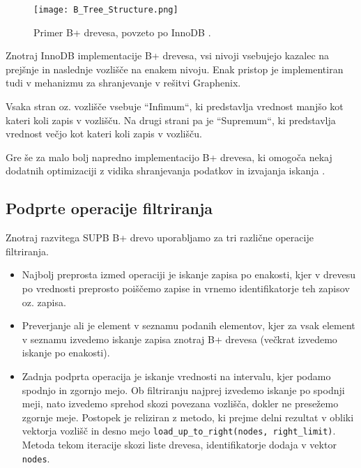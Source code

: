 \documentclass[a4paper,12pt,openright]{book}
\begin{document}
        \begin{figure}[H]
            \centerline{\texttt{[image: B\_Tree\_Structure.png]}}
            \caption{Primer B+ drevesa, povzeto po InnoDB \cite{BPTREE_INNODB}.}
            \label{btree_innodb}
        \end{figure}

        \noindent
        Znotraj InnoDB implementacije B+ drevesa, vsi nivoji vsebujejo kazalec na prejšnje in naslednje vozlišče na enakem nivoju. Enak pristop je implementiran tudi v mehanizmu za shranjevanje v rešitvi Graphenix. 
        
        Vsaka stran oz. vozlišče vsebuje ``Infimum``, ki predstavlja vrednost manjšo kot kateri koli zapis v vozlišču. Na drugi strani pa je ``Supremum``, ki predstavlja vrednost večjo kot kateri koli zapis v vozlišču.

        Gre še za malo bolj napredno implementacijo B+ drevesa, ki omogoča nekaj dodatnih optimizaciji z vidika shranjevanja podatkov in izvajanja iskanja \cite{BPTREE_INNODB}.
        
        \subsection{Podprte operacije filtriranja}
        
        Znotraj razvitega SUPB B+ drevo uporabljamo za tri različne operacije filtriranja.
        \begin{itemize}
            \item Najbolj preprosta izmed operaciji je iskanje zapisa po enakosti, kjer v drevesu po vrednosti preprosto poiščemo zapise in vrnemo identifikatorje teh zapisov oz. zapisa.
            \item Preverjanje ali je element v seznamu podanih elementov, kjer za vsak element v seznamu izvedemo iskanje zapisa znotraj B+ drevesa (večkrat izvedemo iskanje po enakosti).
            \item Zadnja podprta operacija je iskanje vrednosti na intervalu, kjer podamo spodnjo in zgornjo mejo. Ob filtriranju najprej izvedemo iskanje po spodnji meji, nato izvedemo sprehod skozi povezana vozlišča, dokler ne presežemo zgornje meje. Postopek je reliziran z metodo, ki prejme delni rezultat v obliki vektorja vozlišč in desno mejo {\tt load\_up\_to\_right(nodes, right\_limit)}. Metoda tekom iteracije skozi liste drevesa, identifikatorje dodaja v vektor {\tt nodes}.
        \end{itemize}
\end{document}
